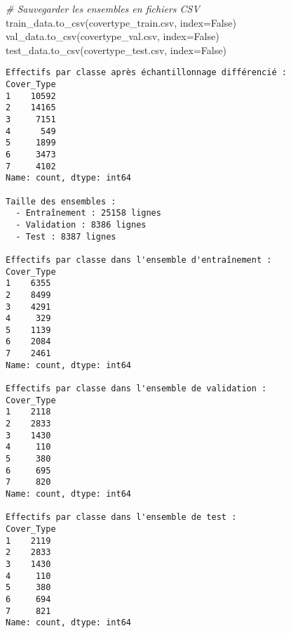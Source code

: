 \documentclass[
  letterpaper,
  DIV=11,
  numbers=noendperiod]{scrartcl}
\newenvironment{Shaded}{}{}
\newcommand{\CommentTok}[1]{\textcolor[rgb]{0.38,0.63,0.69}{\textit{#1}}}
\newcommand{\NormalTok}[1]{#1}
\newcommand{\OperatorTok}[1]{\textcolor[rgb]{0.40,0.40,0.40}{#1}}
\newcommand{\StringTok}[1]{\textcolor[rgb]{0.25,0.44,0.63}{#1}}
\newcommand{\VariableTok}[1]{\textcolor[rgb]{0.10,0.09,0.49}{#1}}
\begin{document}
\begin{Shaded}
\begin{Highlighting}[]
\CommentTok{\# Sauvegarder les ensembles en fichiers CSV}
\NormalTok{train\_data.to\_csv(}\StringTok{\textquotesingle{}covertype\_train.csv\textquotesingle{}}\NormalTok{, index}\OperatorTok{=}\VariableTok{False}\NormalTok{)}
\NormalTok{val\_data.to\_csv(}\StringTok{\textquotesingle{}covertype\_val.csv\textquotesingle{}}\NormalTok{, index}\OperatorTok{=}\VariableTok{False}\NormalTok{)}
\NormalTok{test\_data.to\_csv(}\StringTok{\textquotesingle{}covertype\_test.csv\textquotesingle{}}\NormalTok{, index}\OperatorTok{=}\VariableTok{False}\NormalTok{)}
\end{Highlighting}
\end{Shaded}

\begin{verbatim}
Effectifs par classe après échantillonnage différencié :
Cover_Type
1    10592
2    14165
3     7151
4      549
5     1899
6     3473
7     4102
Name: count, dtype: int64

Taille des ensembles :
  - Entraînement : 25158 lignes
  - Validation : 8386 lignes
  - Test : 8387 lignes

Effectifs par classe dans l'ensemble d'entraînement :
Cover_Type
1    6355
2    8499
3    4291
4     329
5    1139
6    2084
7    2461
Name: count, dtype: int64

Effectifs par classe dans l'ensemble de validation :
Cover_Type
1    2118
2    2833
3    1430
4     110
5     380
6     695
7     820
Name: count, dtype: int64

Effectifs par classe dans l'ensemble de test :
Cover_Type
1    2119
2    2833
3    1430
4     110
5     380
6     694
7     821
Name: count, dtype: int64
\end{verbatim}
\end{document}
